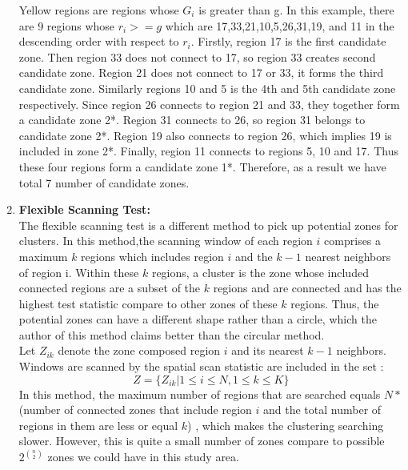 \documentclass[12pt]{article}
\begin{document}
\begin{enumerate}
\begin{figure}[!ht]
	\end{figure}
	
	
	
	Yellow regions are regions whose $G_i$ is greater than g. In this example, there are 9 regions whose $r_i >= g$ which are 17,33,21,10,5,26,31,19, and 11 in the descending order with respect to $r_i$. Firstly, region 17 is the first candidate zone. Then region 33 does not connect to 17, so region 33 creates second candidate zone. Region 21 does not connect to 17 or 33, it forms the third candidate zone. Similarly regions 10 and 5 is the 4th and 5th candidate zone respectively. Since region 26 connects to region 21 and 33, they together form a candidate zone 2*. Region 31 connects to 26, so region 31 belongs to candidate zone 2*. Region 19 also connects to region 26, which implies 19 is included in zone 2*. Finally, region 11 connects to regions 5, 10 and 17. Thus these four regions form a candidate zone 1*. Therefore, as a result we have total 7 number of candidate zones.   
		\item \textbf{ Flexible Scanning Test:}	\\
			
			The flexible scanning test is a different method to pick up potential zones for clusters. In this method,the scanning window of each region $i$ comprises a maximum $k$ regions which includes region $i$ and the $k-1$ nearest neighbors of region i. Within these $k$ regions, a cluster is the zone whose included connected regions are a subset of the $k$ regions and are connected and has the highest test statistic compare to other zones of these $k$ regions. Thus, the potential zones can have a different shape rather than a circle, which the author of this method claims better than the circular method. \\
			
				Let $Z_{ik}$ denote the zone composed region $i$ and its nearest ${k-1}$ neighbors. Windows are scanned by the spatial scan statistic are included in the set : \\
		\[
			Z = \{Z_{ik} | 1 \leq i \leq N, 1 \leq k \leq K \}
		\] 
				In this method, the maximum number of regions that are searched equals $N*$(number of connected zones that include region $i$ and the total number of regions in them are less or equal $k$) , which makes the clustering searching slower. However, this is quite a small number of zones compare to possible $2^{\binom{n}{2}}$ zones we could have in this study area. \\
			

\end{enumerate}
\end{document}
